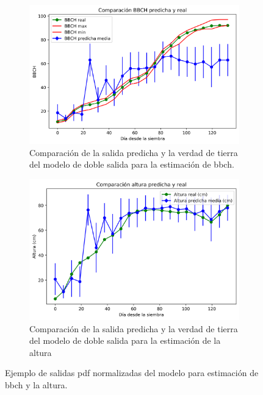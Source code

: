 \begin{figure}[H]
\centering
\begin{subfigure}{\textwidth}
  \centering
  \includegraphics[width=0.95\linewidth]{archivos/tfg/Pixel/BBCHH_COMPARACION_BIEN_BBCH}
  \caption{Comparación de la salida predicha y la verdad de tierra del modelo de doble salida para la estimación de \gls{bbch}. \label{fig:p_sub_c1}}
\end{subfigure}
\begin{subfigure}{\textwidth}
  \centering
  \includegraphics[width=0.95\linewidth]{archivos/tfg/Pixel/BBCHH_COMPARACION_BIEN_H}
  \caption{Comparación de la salida predicha y la verdad de tierra del modelo de doble salida para la estimación de la altura\label{fig:p_sub_c2}}
\end{subfigure}
\caption{Ejemplo de salidas \gls{pdf} normalizadas del modelo para estimación de \gls{bbch} y la altura. \label{fig:p_comp_bh}}
\end{figure}

